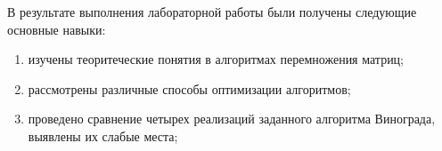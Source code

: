 \Conclusion %

В результате выполнения лабораторной работы были получены следующие основные навыки:
\begin{enumerate}
	\item изучены теоритеческие понятия в алгоритмах перемножения матриц;
	\item рассмотрены различные способы оптимизации алгоритмов;
	\item проведено сравнение четырех реализаций заданного алгоритма Винограда, выявлены их слабые места;
	
\end{enumerate}


